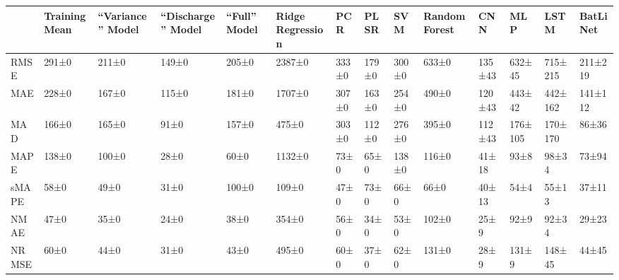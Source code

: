 \begin{tabular}{llllllllllllll}
\toprule
 & Training Mean & ``Variance'' Model & ``Discharge'' Model & ``Full'' Model & Ridge Regression & PCR & PLSR & SVM & Random Forest & CNN & MLP & LSTM & BatLiNet \\
\midrule
RMSE & 291±0 & 211±0 & 149±0 & 205±0 & 2387±0 & 333±0 & 179±0 & 300±0 & 633±0 & 135±43 & 632±45 & 715±215 & 211±219 \\
MAE & 228±0 & 167±0 & 115±0 & 181±0 & 1707±0 & 307±0 & 163±0 & 254±0 & 490±0 & 120±43 & 443±42 & 442±162 & 141±112 \\
MAD & 166±0 & 165±0 & 91±0 & 157±0 & 475±0 & 303±0 & 112±0 & 276±0 & 395±0 & 112±43 & 176±105 & 170±170 & 86±36 \\
MAPE & 138±0 & 100±0 & 28±0 & 60±0 & 1132±0 & 73±0 & 65±0 & 138±0 & 116±0 & 41±18 & 93±8 & 98±34 & 73±94 \\
sMAPE & 58±0 & 49±0 & 31±0 & 100±0 & 109±0 & 47±0 & 73±0 & 66±0 & 66±0 & 40±13 & 54±4 & 55±13 & 37±11 \\
NMAE & 47±0 & 35±0 & 24±0 & 38±0 & 354±0 & 56±0 & 34±0 & 53±0 & 102±0 & 25±9 & 92±9 & 92±34 & 29±23 \\
NRMSE & 60±0 & 44±0 & 31±0 & 43±0 & 495±0 & 60±0 & 37±0 & 62±0 & 131±0 & 28±9 & 131±9 & 148±45 & 44±45 \\
\bottomrule
\end{tabular}
